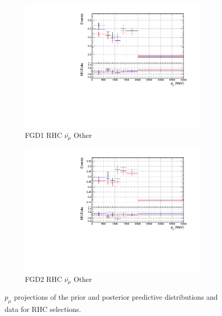 \begin{figure}[!h]
\begin{subfigure}{0.49\textwidth}
  \centering
  \includegraphics[width=\textwidth]{figs/priorpred1D_p_FGD1_anti-numuCC_other}
  \caption{FGD1 RHC $\bar{\nu_{\mu}}$ Other}
\end{subfigure}
\begin{subfigure}{0.49\textwidth}
  \centering
  \includegraphics[width=\textwidth]{figs/priorpred1D_p_FGD2_anti-numuCC_other}
  \caption{FGD2 RHC $\bar{\nu_{\mu}}$ Other}
\end{subfigure}
\caption{$p_{\mu}$ projections of the prior and posterior predictive distributions and data for RHC \numub selections.}
\label{fig:priorpost_rhc_numub_p}
\end{figure}

